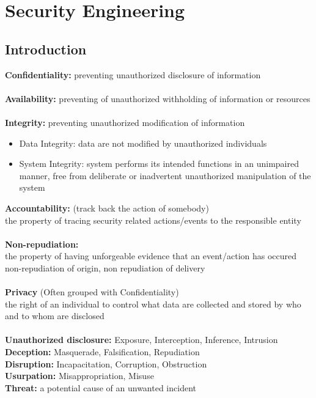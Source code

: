 \documentclass[10pt,a4paper]{book}
\author{Nicolò Fornari}
\begin{document}
\chapter{Security Engineering}
\section{Introduction}
\textbf{Confidentiality:} preventing unauthorized disclosure of information\\\\
\textbf{Availability:} preventing of unauthorized withholding of information or resources \\\\
\textbf{Integrity:}  preventing unauthorized modification of information
\begin{itemize}
\item Data Integrity: data are not modified by unauthorized individuals 
\item System Integrity: system performs its intended functions in an unimpaired manner, free from deliberate or inadvertent unauthorized manipulation of the system
\end{itemize}
\textbf{Accountability:} (track back the action of somebody) \\
the property of tracing security related actions/events to the responsible entity \\\\
\textbf{Non-repudiation:}\\
the property of having unforgeable evidence that an event/action has occured \\
non-repudiation  of origin,  non repudiation of delivery \\\\
\textbf{Privacy} (Often grouped with Confidentiality) \\
the right of an individual to control what data are collected and stored by who and to whom are disclosed \\\\
\textbf{Unauthorized disclosure:} Exposure, Interception, Inference, Intrusion \\
\textbf{Deception:} Masquerade, Falsification, Repudiation\\
\textbf{Disruption:} Incapacitation, Corruption, Obstruction\\
\textbf{Usurpation:} Misappropriation, Misuse\\
\textbf{Threat:} a potential cause of an unwanted incident
\newpage
\end{document}
